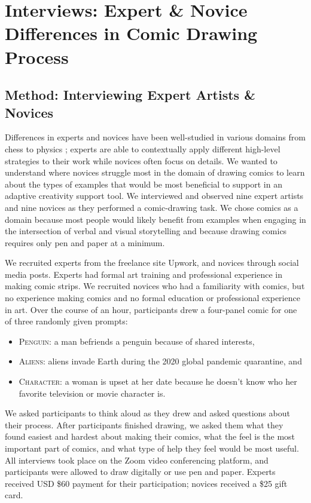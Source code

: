 \section{Interviews: Expert \& Novice Differences in Comic Drawing Process}
\label{sec:shown_ints} 

\subsection{Method: Interviewing Expert Artists \& Novices}
Differences in experts and novices have been well-studied in various domains from chess \cite{Chase1973} to physics \cite{chi1981categorization}; experts are able to contextually apply different high-level strategies to their work while novices often focus on details. We wanted to understand where novices struggle most in the domain of drawing comics to learn about the types of examples that would be most beneficial to support in an adaptive creativity support tool. 
We interviewed and observed nine expert artists and nine novices as they performed a comic-drawing task. We chose comics as a domain because most people would likely benefit from examples when engaging in the intersection of verbal and visual storytelling \cite{abel2008drawing,eisner2008comics, mccloud2006making} and because drawing comics requires only pen and paper at a minimum. 

We recruited experts from the freelance site Upwork, and novices through social media posts. Experts had formal art training and professional experience in making comic strips. We recruited novices who had a familiarity with comics, but no experience making comics and no formal education or professional experience in art. Over the course of an hour, participants drew a four-panel comic for one of three randomly given prompts: 

\begin{itemize}
\item{\textsc{Penguin}: a man befriends a penguin because of shared interests,}
\item{\textsc{Aliens}: aliens invade Earth during the 2020 global pandemic quarantine, and} \item{\textsc{Character}: a woman is upset at her date because he doesn't know who her favorite television or movie character is.} 

\end{itemize}
We asked participants to think aloud as they drew and asked questions about their process. After participants finished drawing, we asked them what they found easiest and hardest about making their comics, what the feel is the most important part of comics, and what type of help they feel would be most useful. All interviews took place on the Zoom video conferencing platform, and participants were allowed to draw digitally or use pen and paper. Experts received USD \$60 payment for their participation; novices received a \$25 gift card.

